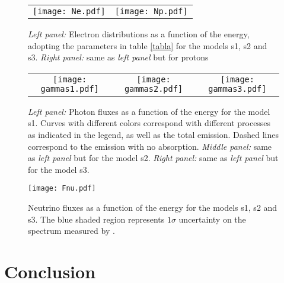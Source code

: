 \documentclass[baaa]{baaa}
\begin{document}
\begin{figure*} 
\centering
\renewcommand{\arraystretch}{0}
\setlength{\tabcolsep}{0pt}

\begin{tabular}{cc}
\texttt{[image: Ne.pdf]} &
\texttt{[image: Np.pdf]} 
\end{tabular}

\caption{\textit{Left panel:} Electron distributions as a function of the energy, adopting the parameters in table \ref{tabla} for the models s1, s2 and s3. \textit{Right panel:} same as \textit{left panel} but for protons}
\label{fig:Nprimary}
\end{figure*} 

\begin{figure*} 
\centering
\renewcommand{\arraystretch}{0}
\setlength{\tabcolsep}{0pt}

\begin{tabular}{ccc}
\texttt{[image: gammas1.pdf]} &
\texttt{[image: gammas2.pdf]} &
\texttt{[image: gammas3.pdf]} 
\end{tabular}

\caption{\textit{Left panel:} Photon fluxes as a function of the energy for the model s1. Curves with different colors correspond with different processes as indicated in the legend, as well as the total emission. Dashed lines correspond to the emission with no absorption. \textit{Middle panel:} same as \textit{left panel} but for the model s2. \textit{Right panel:} same as \textit{left panel} but for the model s3.}
\label{fig:gammas}
\end{figure*} 


\begin{figure*} 
\centering
\renewcommand{\arraystretch}{0}
\setlength{\tabcolsep}{0pt}
\texttt{[image: Fnu.pdf]}
\caption{Neutrino fluxes as a function of the energy for the models s1, s2 and s3. The blue shaded region represents $1 \sigma$ uncertainty on the spectrum measured by \cite{Aartsen2020}.}
\label{fig:neutrinos}
\end{figure*} 



\section{Conclusion}\label{S_conclusion}
\end{document}
